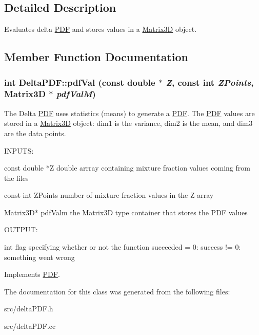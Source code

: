 \subsection{Detailed Description}
Evaluates delta \hyperlink{classPDF}{PDF} and stores values in a \hyperlink{classMatrix3D}{Matrix3D} object. 

\subsection{Member Function Documentation}
\hypertarget{classDeltaPDF_a787e205c3bd8d4f95f7c528497e3a617}{
\subsubsection[{pdfVal}]{\setlength{\rightskip}{0pt plus 5cm}int DeltaPDF::pdfVal (const double $\ast$ {\em Z}, \/  const int {\em ZPoints}, \/  {\bf Matrix3D} $\ast$ {\em pdfValM})}}
\label{dd/d98/classDeltaPDF_a787e205c3bd8d4f95f7c528497e3a617}
The Delta \hyperlink{classPDF}{PDF} uses statistics (means) to generate a \hyperlink{classPDF}{PDF}. The \hyperlink{classPDF}{PDF} values are stored in a \hyperlink{classMatrix3D}{Matrix3D} object: dim1 is the variance, dim2 is the mean, and dim3 are the data points.

\begin{DoxyVerb}
  
  INPUTS: 
  
  const double *Z           double arrray containing mixture fraction values coming from the files

  const int ZPoints         number of mixture fraction values in the Z array

  Matrix3D* pdfValm         the Matrix3D type container that stores the PDF values


  OUTPUT:

  int                       flag specifying whether or not the function succeeded
                             = 0: success
			    != 0: something went wrong

  \end{DoxyVerb}
 

Implements \hyperlink{classPDF}{PDF}.



The documentation for this class was generated from the following files:\begin{DoxyCompactItemize}
\item 
src/deltaPDF.h\item 
src/deltaPDF.cc\end{DoxyCompactItemize}
